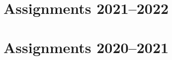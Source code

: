 \documentclass[assignments]{subfiles}
\begin{document}
\maketitle
\tableofcontents






\chapter{Assignments 2021--2022}



\chapter{Assignments 2020--2021}






\end{document}
